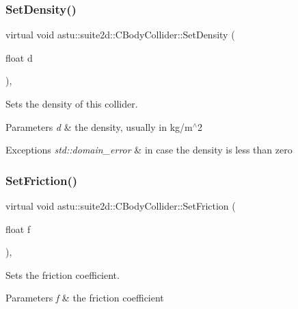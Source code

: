 \subsubsection{\texorpdfstring{Set\+Density()}{SetDensity()}}
{\footnotesize\ttfamily virtual void astu\+::suite2d\+::\+C\+Body\+Collider\+::\+Set\+Density (\begin{DoxyParamCaption}\item[{float}]{d }\end{DoxyParamCaption})\hspace{0.3cm}{\ttfamily [inline]}, {\ttfamily [virtual]}}

Sets the density of this collider.


\begin{DoxyParams}{Parameters}
{\em d} & the density, usually in kg/m$^\wedge$2 \\
\hline
\end{DoxyParams}

\begin{DoxyExceptions}{Exceptions}
{\em std\+::domain\+\_\+error} & in case the density is less than zero \\
\hline
\end{DoxyExceptions}
\mbox{\label{classastu_1_1suite2d_1_1CBodyCollider_ab457509068d608af68158417e32a023d}} 
\subsubsection{\texorpdfstring{Set\+Friction()}{SetFriction()}}
{\footnotesize\ttfamily virtual void astu\+::suite2d\+::\+C\+Body\+Collider\+::\+Set\+Friction (\begin{DoxyParamCaption}\item[{float}]{f }\end{DoxyParamCaption})\hspace{0.3cm}{\ttfamily [inline]}, {\ttfamily [virtual]}}

Sets the friction coefficient.


\begin{DoxyParams}{Parameters}
{\em f} & the friction coefficient \\
\hline
\end{DoxyParams}

